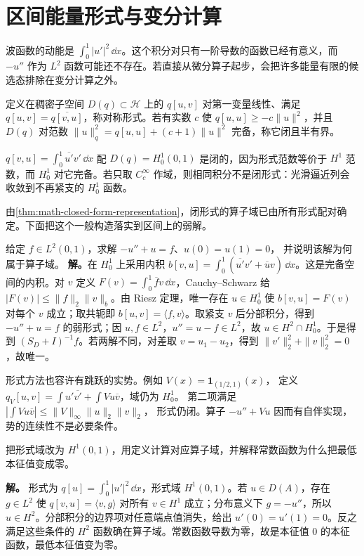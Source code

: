 \section{区间能量形式与变分计算}

波函数的动能是 \(\int_0^1|u'|^2\,\dd x\)。这个积分对只有一阶导数的函数已经有意义，而 \(-u''\) 作为 \(L^2\) 函数可能还不存在。若直接从微分算子起步，会把许多能量有限的候选态排除在变分计算之外。

\begin{definition}[闭半有界形式]
定义在稠密子空间 \(D(q)\subset\mathcal H\) 上的 \(q[u,v]\) 对第一变量线性、满足 \(q[u,v]=\overline{q[v,u]}\)，称对称形式。若有实数 \(c\) 使 \(q[u,u]\ge-c\|u\|^2\)，并且 \(D(q)\) 对范数 \(\|u\|_q^2=q[u,u]+(c+1)\|u\|^2\) 完备，称它闭且半有界。
\end{definition}

\(q[v,u]=\int_0^1\overline{u'}v'\,\dd x\) 配 \(D(q)=H_0^1(0,1)\) 是闭的，因为形式范数等价于 \(H^1\) 范数，而 \(H_0^1\) 对它完备。若只取 \(C_c^\infty\) 作域，则相同积分不是闭形式：光滑逼近列会收敛到不再紧支的 \(H_0^1\) 函数。

由\cref{thm:math-closed-form-representation}，闭形式的算子域已由所有形式配对确定。下面把这个一般构造落实到区间上的弱解。



\begin{workedexample}
给定 \(f\in L^2(0,1)\)，求解 \(-u''+u=f\)、\(u(0)=u(1)=0\)，
并说明该解为何属于算子域。
\textbf{解。}在 \(H_0^1\) 上采用内积 \(b[v,u]=\int_0^1(\overline{u'}v'+\overline u v)\,\dd x\)。这是完备空间的内积。对 \(v\) 定义 \(F(v)=\int_0^1\overline f v\,\dd x\)，Cauchy--Schwarz 给 \(|F(v)|\le\|f\|_2\|v\|_b\)。由 Riesz 定理，唯一存在 \(u\in H_0^1\) 使 \(b[v,u]=F(v)\) 对每个 \(v\) 成立；取共轭即 \(b[u,v]=\langle f,v\rangle\)。取紧支 \(v\) 后分部积分，得到 \(-u''+u=f\) 的弱形式；因 \(u,f\in L^2\)，\(u''=u-f\in L^2\)，故 \(u\in H^2\cap H_0^1\)。于是得到 \((S_D+I)^{-1}f\)。若两解不同，对差取 \(v=u_1-u_2\)，得到 \(\|v'\|_2^2+\|v\|_2^2=0\)，故唯一。
\end{workedexample}

形式方法也容许有跳跃的实势。例如 \(V(x)=\mathbf1_{(1/2,1)}(x)\)，
定义 \(q_V[u,v]=\int u'\overline{v'}+\int Vu\overline v\)，域仍为 \(H_0^1\)。
第二项满足 \(|\int Vu\overline v|\le\|V\|_\infty\|u\|_2\|v\|_2\)，
形式仍闭。算子 \(-u''+Vu\) 因而有自伴实现，势的连续性不是必要条件。


\par
\begin{workedexample}
把形式域改为 \(H^1(0,1)\)，用定义计算对应算子域，并解释常数函数为什么把最低本征值变成零。


\textbf{解。} 形式为 \(q[u]=\int_0^1|u'|^2\,\dd x\)，形式域 \(H^1(0,1)\)。若 \(u\in D(A)\)，存在 \(g\in L^2\) 使 \(q[v,u]=\langle v,g\rangle\) 对所有 \(v\in H^1\) 成立；分布意义下 \(g=-u''\)，所以 \(u\in H^2\)。分部积分的边界项对任意端点值消失，给出 \(u'(0)=u'(1)=0\)。反之满足这些条件的 \(H^2\) 函数确在算子域。常数函数导数为零，故是本征值 \(0\) 的本征函数，最低本征值变为零。
\end{workedexample}
\par
